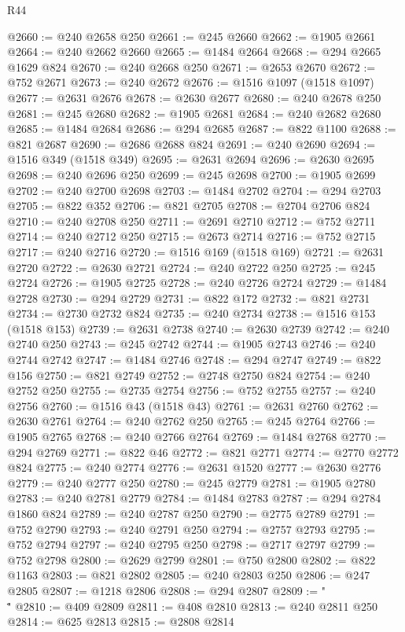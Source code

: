 \begin{lexlean}{R44}
\begin{coremodule}
{@2660 := @240 @2658 @250
@2661 := @245 @2660
@2662 := @1905 @2661
@2664 := @240 @2662 @2660
@2665 := @1484 @2664
@2668 := @294 @2665 @1629 @824
@2670 := @240 @2668 @250
@2671 := @2653 @2670
@2672 := @752 @2671
@2673 := @240 @2672
@2676 := @1516 @1097 (@1518 @1097)
@2677 := @2631 @2676
@2678 := @2630 @2677
@2680 := @240 @2678 @250
@2681 := @245 @2680
@2682 := @1905 @2681
@2684 := @240 @2682 @2680
@2685 := @1484 @2684
@2686 := @294 @2685
@2687 := @822 @1100
@2688 := @821 @2687
@2690 := @2686 @2688 @824
@2691 := @240 @2690
@2694 := @1516 @349 (@1518 @349)
@2695 := @2631 @2694
@2696 := @2630 @2695
@2698 := @240 @2696 @250
@2699 := @245 @2698
@2700 := @1905 @2699
@2702 := @240 @2700 @2698
@2703 := @1484 @2702
@2704 := @294 @2703
@2705 := @822 @352
@2706 := @821 @2705
@2708 := @2704 @2706 @824
@2710 := @240 @2708 @250
@2711 := @2691 @2710
@2712 := @752 @2711
@2714 := @240 @2712 @250
@2715 := @2673 @2714
@2716 := @752 @2715
@2717 := @240 @2716
@2720 := @1516 @169 (@1518 @169)
@2721 := @2631 @2720
@2722 := @2630 @2721
@2724 := @240 @2722 @250
@2725 := @245 @2724
@2726 := @1905 @2725
@2728 := @240 @2726 @2724
@2729 := @1484 @2728
@2730 := @294 @2729
@2731 := @822 @172
@2732 := @821 @2731
@2734 := @2730 @2732 @824
@2735 := @240 @2734
@2738 := @1516 @153 (@1518 @153)
@2739 := @2631 @2738
@2740 := @2630 @2739
@2742 := @240 @2740 @250
@2743 := @245 @2742
@2744 := @1905 @2743
@2746 := @240 @2744 @2742
@2747 := @1484 @2746
@2748 := @294 @2747
@2749 := @822 @156
@2750 := @821 @2749
@2752 := @2748 @2750 @824
@2754 := @240 @2752 @250
@2755 := @2735 @2754
@2756 := @752 @2755
@2757 := @240 @2756
@2760 := @1516 @43 (@1518 @43)
@2761 := @2631 @2760
@2762 := @2630 @2761
@2764 := @240 @2762 @250
@2765 := @245 @2764
@2766 := @1905 @2765
@2768 := @240 @2766 @2764
@2769 := @1484 @2768
@2770 := @294 @2769
@2771 := @822 @46
@2772 := @821 @2771
@2774 := @2770 @2772 @824
@2775 := @240 @2774
@2776 := @2631 @1520
@2777 := @2630 @2776
@2779 := @240 @2777 @250
@2780 := @245 @2779
@2781 := @1905 @2780
@2783 := @240 @2781 @2779
@2784 := @1484 @2783
@2787 := @294 @2784 @1860 @824
@2789 := @240 @2787 @250
@2790 := @2775 @2789
@2791 := @752 @2790
@2793 := @240 @2791 @250
@2794 := @2757 @2793
@2795 := @752 @2794
@2797 := @240 @2795 @250
@2798 := @2717 @2797
@2799 := @752 @2798
@2800 := @2629 @2799
@2801 := @750 @2800
@2802 := @822 @1163
@2803 := @821 @2802
@2805 := @240 @2803 @250
@2806 := @247 @2805
@2807 := @1218 @2806
@2808 := @294 @2807
@2809 := "\\\""
@2810 := @409 @2809
@2811 := @408 @2810
@2813 := @240 @2811 @250
@2814 := @625 @2813
@2815 := @2808 @2814
}
\end{coremodule}
\end{lexlean}
